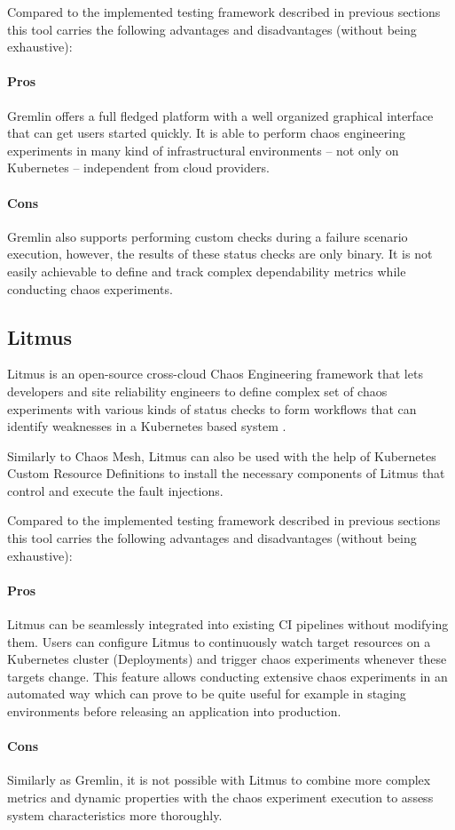 Compared to the implemented testing framework described in previous sections this tool carries the following advantages and disadvantages (without being exhaustive):

\paragraph{Pros} Gremlin offers a full fledged platform with a well organized graphical interface that can get users started quickly. It is able to perform chaos engineering experiments in many kind of infrastructural environments -- not only on Kubernetes -- independent from cloud providers.

\paragraph{Cons} Gremlin also supports performing custom checks during a failure scenario execution, however, the results of these status checks are only binary. It is not easily achievable to define and track complex dependability metrics while conducting chaos experiments.

\subsection{Litmus}

Litmus is an open-source cross-cloud Chaos Engineering framework that lets developers and site reliability engineers to define complex set of chaos experiments with various kinds of status checks to form workflows that can identify weaknesses in a Kubernetes based system \cite{Litmus}.

Similarly to Chaos Mesh, Litmus can also be used with the help of Kubernetes Custom Resource Definitions to install the necessary components of Litmus that control and execute the fault injections.

Compared to the implemented testing framework described in previous sections this tool carries the following advantages and disadvantages (without being exhaustive):

\paragraph{Pros} Litmus can be seamlessly integrated into existing CI pipelines without modifying them. Users can configure Litmus to continuously watch target resources on a Kubernetes cluster (\eg Deployments) and trigger chaos experiments whenever these targets change. This feature allows conducting extensive chaos experiments in an automated way which can prove to be quite useful for example in staging environments before releasing an application into production.

\paragraph{Cons} Similarly as Gremlin, it is not possible with Litmus to combine more complex metrics and dynamic properties with the chaos experiment execution to assess system characteristics more thoroughly.
